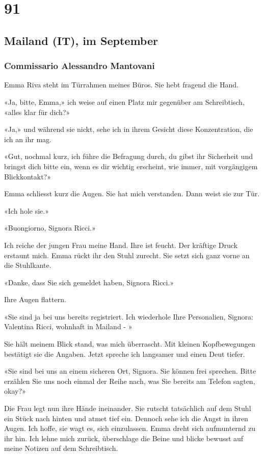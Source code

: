 \chapter{91}

\section{Mailand (IT), im 
September}


\subsection{Commissario Alessandro Mantovani}

Emma Riva steht im Türrahmen meines Büros. Sie hebt fragend die Hand.

«Ja, bitte, Emma,» ich weise auf einen Platz mir gegenüber am
Schreibtisch, «alles klar für dich?»

«Ja,» und während sie nickt, sehe ich in ihrem Gesicht diese
Konzentration, die ich an ihr mag.

«Gut, nochmal kurz, ich führe die Befragung durch, du gibst ihr
Sicherheit und bringst dich bitte ein, wenn es dir wichtig erscheint,
wie immer, mit vorgängigem Blickkontakt?»

Emma schliesst kurz die Augen. Sie hat mich verstanden. Dann weist sie
zur Tür.

«Ich hole sie.»

\sectionbreak

«Buongiorno, Signora Ricci.»

Ich reiche der jungen Frau meine Hand. Ihre ist feucht. Der kräftige
Druck erstaunt mich. Emma rückt ihr den Stuhl zurecht. Sie setzt sich ganz vorne an die Stuhlkante.

«Danke, dass Sie sich gemeldet haben, Signora Ricci.»

Ihre Augen flattern. 

«Sie sind ja bei uns bereits registriert. Ich wiederhole Ihre Personalien, Signora: Valentina Ricci, wohnhaft in Mailand - »

Sie hält meinem Blick stand, was mich überrascht. Mit kleinen 
Kopfbewegungen bestätigt sie die Angaben.
Jetzt spreche ich langsamer und einen Deut tiefer.

«Sie sind bei uns an einem sicheren Ort, Signora. Sie können frei
sprechen. Bitte erzählen Sie uns noch einmal der Reihe nach, was Sie
bereits am Telefon sagten, okay?»

Die Frau legt nun ihre Hände ineinander. Sie rutscht tatsächlich auf dem
Stuhl ein Stück nach hinten und atmet tief ein. Dennoch sehe ich die
Angst in ihren Augen.
Ich hoffe, sie wagt es, sich einzulassen.
Emma dreht sich aufmunternd zu ihr hin. Ich lehne mich zurück,
überschlage die Beine und blicke bewusst auf meine Notizen auf dem
Schreibtisch.

